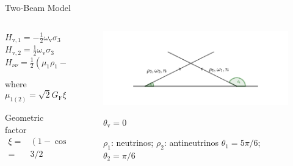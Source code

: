 \documentclass[9pt]{beamer}
\begin{document}
\begin{darkframes}
\begin{frame}{Two-Beam Model}
\begin{columns}[T]
\begin{column}{0.3\textwidth}
$H_{\mathrm v,1} = - \frac{1}{2}\omega_{\mathrm v} \sigma_3 $\\
$H_{\mathrm v,2} =  \frac{1}{2}\omega_{\mathrm v} \sigma_3 $\\
$H_{\nu\nu} = \frac{1}{2} (\mu_1\rho_1- \mu_2\rho_2)$


where
\begin{equation*}
   \mu_{1(2)} = \sqrt{2} G_{\mathrm F} \xi n_{2(1)}
\end{equation*}

Geometric factor
\begin{align*}
\xi =& (1-\cos(\theta_1-\theta_2)) \\
=& 3/2%
\end{align*}



\end{column}

\begin{column}{0.7\textwidth}
\begin{figure}
   \includegraphics[width=\textwidth]{assets/two-beams-model-sym}
   \caption*{$\rho_1$: neutrinos; $\rho_2$: antineutrinos
   $\theta_1= 5\pi/6$; $\theta_2 = \pi/6$}
   $\theta_{\mathrm v}=0$
\end{figure}

%

\end{column}


\end{columns}



\end{frame}
\end{darkframes}
\end{document}

